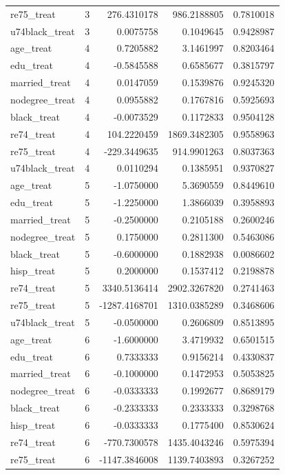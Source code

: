\documentclass[
]{article}
\begin{document}
\begin{longtable}[]{@{}lrrrr@{}}
re75\_treat & 3 & 276.4310178 & 986.2188805 & 0.7810018 \\
u74black\_treat & 3 & 0.0075758 & 0.1049645 & 0.9428987 \\
age\_treat & 4 & 0.7205882 & 3.1461997 & 0.8203464 \\
edu\_treat & 4 & -0.5845588 & 0.6585677 & 0.3815797 \\
married\_treat & 4 & 0.0147059 & 0.1539876 & 0.9245320 \\
nodegree\_treat & 4 & 0.0955882 & 0.1767816 & 0.5925693 \\
black\_treat & 4 & -0.0073529 & 0.1172833 & 0.9504128 \\
re74\_treat & 4 & 104.2220459 & 1869.3482305 & 0.9558963 \\
re75\_treat & 4 & -229.3449635 & 914.9901263 & 0.8037363 \\
u74black\_treat & 4 & 0.0110294 & 0.1385951 & 0.9370827 \\
age\_treat & 5 & -1.0750000 & 5.3690559 & 0.8449610 \\
edu\_treat & 5 & -1.2250000 & 1.3866039 & 0.3958893 \\
married\_treat & 5 & -0.2500000 & 0.2105188 & 0.2600246 \\
nodegree\_treat & 5 & 0.1750000 & 0.2811300 & 0.5463086 \\
black\_treat & 5 & -0.6000000 & 0.1882938 & 0.0086602 \\
hisp\_treat & 5 & 0.2000000 & 0.1537412 & 0.2198878 \\
re74\_treat & 5 & 3340.5136414 & 2902.3267820 & 0.2741463 \\
re75\_treat & 5 & -1287.4168701 & 1310.0385289 & 0.3468606 \\
u74black\_treat & 5 & -0.0500000 & 0.2606809 & 0.8513895 \\
age\_treat & 6 & -1.6000000 & 3.4719932 & 0.6501515 \\
edu\_treat & 6 & 0.7333333 & 0.9156214 & 0.4330837 \\
married\_treat & 6 & -0.1000000 & 0.1472953 & 0.5053825 \\
nodegree\_treat & 6 & -0.0333333 & 0.1992677 & 0.8689179 \\
black\_treat & 6 & -0.2333333 & 0.2333333 & 0.3298768 \\
hisp\_treat & 6 & -0.0333333 & 0.1775400 & 0.8530624 \\
re74\_treat & 6 & -770.7300578 & 1435.4043246 & 0.5975394 \\
re75\_treat & 6 & -1147.3846008 & 1139.7403893 & 0.3267252 \\

\end{longtable}
\end{document}

